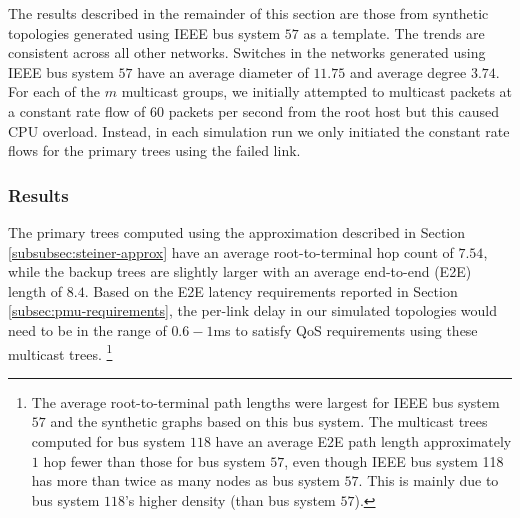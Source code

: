 The results described in the remainder of this section are those from synthetic topologies generated using IEEE bus system $57$ as a template. The trends are consistent across 
all other networks. Switches in the networks generated using IEEE bus system $57$ have an average diameter of $11.75$ and average degree $3.74$.   
For each of the $m$ multicast groups, we initially attempted to multicast packets at a constant rate flow of $60$ packets per second from the root host but this 
caused CPU overload.  Instead, in each simulation run we only initiated the constant rate flows for the primary trees using the failed link.



\subsubsection{\steinern Results}
\label{subsubsec:tree-stats}

The primary trees computed using the \arbor approximation described in Section \ref{subsubsec:steiner-approx} have an average root-to-terminal hop count of $7.54$, while the \steiner backup trees are 
slightly larger with an average end-to-end (E2E) length of $8.4$.  Based on the E2E latency requirements reported in Section \ref{subsec:pmu-requirements}, the 
per-link delay in our simulated topologies would need to be in the range of $0.6-1$ms to satisfy QoS requirements using these multicast trees.  
\footnote{The average root-to-terminal path lengths were largest for IEEE bus system $57$ and the synthetic graphs based on this bus system.  The multicast trees computed for bus system $118$ 
have an average E2E path length approximately $1$ hop fewer than those for bus system $57$, even though IEEE bus system 118 has more than twice as many nodes as bus system $57$.  This is mainly 
due to bus system $118$'s higher density (than bus system $57$). }



